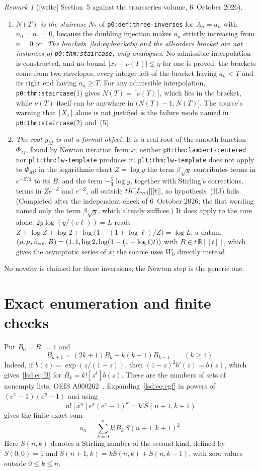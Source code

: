 \documentclass[11pt]{article}
\theoremstyle{remark}\newtheorem{remark}{Remark}
\newcommand{\file}[1]{\nolinkurl{#1}}
\begin{document}
\begin{remark}[{[write]} Section~5 against the transseries volume, 6~October 2026]
\begin{enumerate}
\item[(c)] \emph{$N(T)$ is the staircase} $N_\ast$ of
 \file{p0:def:three-inverses} for $A_n=a_n$ with $n_0=n_1=0$, because the
 doubling injection makes $a_n$ strictly increasing from $n=0$ on.
 \emph{The brackets~\eqref{lsd:eq:brackets} and the all-orders bracket are not
 instances of \file{p0:thm:staircase}, only analogues.} No admissible
 interpolation is constructed, and no bound $|x_\ast-\nu(T)|\le\eta$ for one
 is proved: the brackets come from two envelopes, every integer left of the
 bracket having $a_n<T$ and its right end having $a_n\ge T$. For any
 admissible interpolation, \file{p0:thm:staircase}(1) gives
 $N(T)=\lceil\nu(T)\rceil$, which lies in the bracket, while $\nu(T)$ itself
 can be anywhere in $(N(T)-1,N(T)]$. The source's warning that
 $\lceil X_1\rceil$ alone is not justified is the failure mode named in
 \file{p0:thm:staircase}(2) and~(5).
\item[(d)] \emph{The root $y_M$ is not a formal object.} It is a real root of
 the smooth function $\Phi_M$, found by Newton iteration from $x$; neither
 \file{p0:thm:lambert-centered} nor \file{plt:thm:lw-template} produces it.
 \file{plt:thm:lw-template} does not apply to $\Phi_M$: in the logarithmic
 chart $Z=\log y$ the term $\beta\sqrt y$ contributes terms in $e^{-Z/2}$ to
 its $B$, and the term $-\frac54\log y$, together with Stirling's corrections,
 terms in $Ze^{-Z}$ and $e^{-Z}$, all outside $tK[L_{\rm vol}][[t]]$, so
 hypothesis~(H3) fails. \textup{(Completed after the independent check of
 6~October 2026; the first wording named only the term $\beta\sqrt y$, which
 already suffices.)} It does apply
 to the core alone: $2y\log(y/(e\ell))=L$ reads
 $Z+\log Z+\log2+\log\bigl(1-(1+\log\ell)/Z\bigr)=\log L$, a datum
 $(\rho,\mu,\beta_{\rm vol},B)=(1,1,\log2,\log(1-(1+\log\ell)t))$ with
 $B\in t\,\mathbb R[[t]]$, which gives the asymptotic series of $x$; the source
 uses $W_0$ directly instead.
\end{enumerate}
No novelty is claimed for these inversions; the Newton step is the generic one.
\end{remark}

\section{Exact enumeration and finite checks}
Put $B_0=B_1=1$ and
\begin{equation}\label{lsd:eq:B}
 B_{k+1}=(2k+1)B_k-k(k-1)B_{k-1}\qquad(k\geq1).
\end{equation}
Indeed, if $b(z)=\exp(z/(1-z))$, then $(1-z)^2b'(z)=b(z)$, which gives~\eqref{lsd:eq:B} for $B_k=k![z^k]b(z)$. These are the numbers of sets of nonempty lists, OEIS A000262~\cite{lists}. Expanding~\eqref{lsd:eq:egf} in powers of $(e^x-1)(e^y-1)$ and using
\[
 n![x^n]e^x(e^x-1)^k=k!S(n+1,k+1)
\]
gives the finite exact sum
\begin{equation}\label{lsd:eq:exact}
 a_n=\sum_{k=0}^n k!B_k\,S(n+1,k+1)^2.
\end{equation}
Here $S(n,k)$ denotes a Stirling number of the second kind, defined by
$S(0,0)=1$ and $S(n+1,k)=kS(n,k)+S(n,k-1)$, with zero values outside $0\leq k\leq n$.
\end{document}
